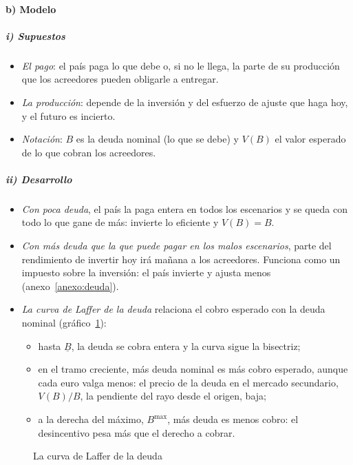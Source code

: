 \documentclass[11pt]{article}
\begin{document}
\paragraph{b) Modelo}

\subparagraph{i) Supuestos}

\begin{itemize}
\item \emph{El pago}: el país paga lo que debe o, si no le llega, la parte de su producción que los acreedores pueden obligarle a entregar.
\item \emph{La producción}: depende de la inversión y del esfuerzo de ajuste que haga hoy, y el futuro es incierto.
\item \emph{Notación}: $B$ es la deuda nominal (lo que se debe) y $V(B)$ el valor esperado de lo que cobran los acreedores.
\end{itemize}

\subparagraph{ii) Desarrollo}

\begin{itemize}
\item \emph{Con poca deuda}, el país la paga entera en todos los escenarios y se queda con todo lo que gane de más: invierte lo eficiente y $V(B)=B$.
\item \emph{Con más deuda que la que puede pagar en los malos escenarios}, parte del rendimiento de invertir hoy irá mañana a los acreedores. Funciona como un impuesto sobre la inversión: el país invierte y ajusta menos (anexo~\ref{anexo:deuda}).
\item \emph{La curva de Laffer de la deuda} relaciona el cobro esperado con la deuda nominal\nocite{Krugman1989MarketBased} (gráfico~\ref{fig:laffer-deuda}):
  \begin{itemize}
  \item hasta $\underline B$, la deuda se cobra entera y la curva sigue la bisectriz;
  \item en el tramo creciente, más deuda nominal es más cobro esperado, aunque cada euro valga menos: el precio de la deuda en el mercado secundario, $V(B)/B$, la pendiente del rayo desde el origen, baja;
  \item a la derecha del máximo, $B^{\max}$, más deuda es menos cobro: el desincentivo pesa más que el derecho a cobrar.
  \end{itemize}
\end{itemize}

\begin{figure}[H]
\centering
\caption{La curva de Laffer de la deuda}\label{fig:laffer-deuda}
\end{figure}
\end{document}
